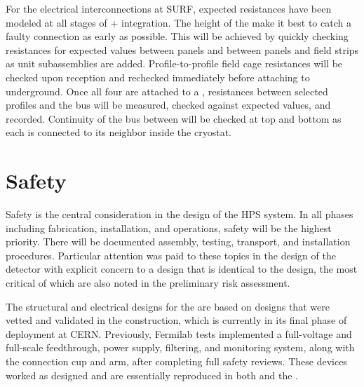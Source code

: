 For the electrical interconnections  at SURF, expected resistances have been modeled at all stages of
+ integration.  The height of the  make it best to catch a
faulty connection as early as possible.  This will be achieved by
quickly checking resistances for expected values between  panels and between  panels and field strips as  unit subassemblies are added.  Profile-to-profile field cage resistances
will be checked upon reception and rechecked immediately before
attaching to  underground.  Once all four  are attached to a
, resistances between selected  profiles and the  bus will be
measured, checked against expected values, and recorded. Continuity of
the  bus between  will be checked at top and bottom as each 
is connected to its neighbor inside the cryostat.


\section{Safety}
\label{sec:fdsp-hv-safety}

Safety is the central consideration in the design of the HPS  system. In all phases including fabrication, installation, and operations, safety will be the highest priority. There will be documented assembly, testing, transport, and installation procedures. Particular attention was paid to these topics in the design of %
the  detector with explicit concern to a design that is identical to the  design, the most critical of which are also noted in the preliminary  risk assessment. 

The structural and electrical designs for the   are based on designs that were vetted and validated in the  construction, which is currently in its final phase of deployment at CERN. Previously, Fermilab  tests implemented a full-voltage and full-scale  feedthrough, power supply, filtering, and monitoring system, along with the  connection cup and arm, after completing full safety reviews. These devices worked as designed and are essentially reproduced in both  and the . 

